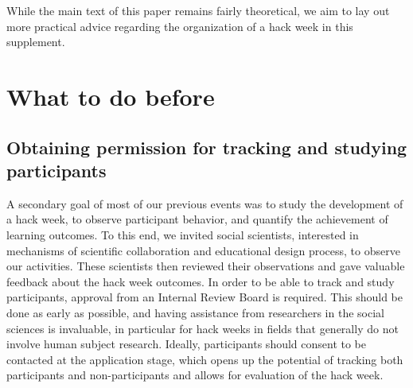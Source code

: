 \documentclass{aastex62}
\begin{document}

\newpage

\tableofcontents

\newpage

\noindent While the main text of this paper remains fairly theoretical, we aim to lay out more practical advice regarding the organization of a hack week in this supplement. 



\section{What to do before}

\subsection{Obtaining permission for tracking and studying participants}
A secondary goal of most of our previous events was to study the development of a hack week, to observe participant behavior, and quantify the achievement of learning outcomes. To this end, we invited social scientists, interested in mechanisms of scientific collaboration and educational design process, to observe our activities. These scientists then reviewed their observations and gave valuable feedback about the hack week outcomes. In order to be able to track and study participants, approval from an Internal Review Board is required. This should be done as early as possible, and having assistance from researchers in the social sciences is invaluable, in particular for hack weeks in fields that generally do not involve human subject research. Ideally, participants should consent to be contacted at the application stage, which opens up the potential of tracking both participants and non-participants and allows for evaluation of the hack week.
\end{document}
